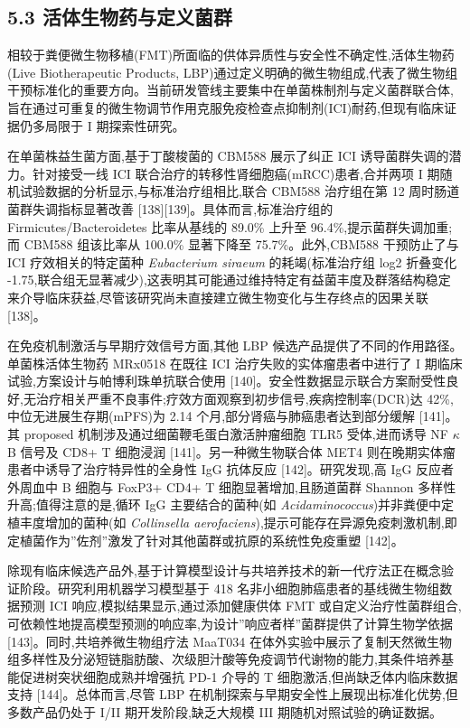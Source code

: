 \documentclass[11pt]{article}
\begin{document}
\subsection{5.3 活体生物药与定义菌群}\label{ux6d3bux4f53ux751fux7269ux836fux4e0eux5b9aux4e49ux83ccux7fa4}

相较于粪便微生物移植(FMT)所面临的供体异质性与安全性不确定性,活体生物药(Live Biotherapeutic Products, LBP)通过定义明确的微生物组成,代表了微生物组干预标准化的重要方向。当前研发管线主要集中在单菌株制剂与定义菌群联合体,旨在通过可重复的微生物调节作用克服免疫检查点抑制剂(ICI)耐药,但现有临床证据仍多局限于 I 期探索性研究。

在单菌株益生菌方面,基于丁酸梭菌的 CBM588 展示了纠正 ICI 诱导菌群失调的潜力。针对接受一线 ICI 联合治疗的转移性肾细胞癌(mRCC)患者,合并两项 I 期随机试验数据的分析显示,与标准治疗组相比,联合 CBM588 治疗组在第 12 周时肠道菌群失调指标显著改善 {[}138{]}{[}139{]}。具体而言,标准治疗组的 Firmicutes/Bacteroidetes 比率从基线的 89.0\% 上升至 96.4\%,提示菌群失调加重;而 CBM588 组该比率从 100.0\% 显著下降至 75.7\%。此外,CBM588 干预防止了与 ICI 疗效相关的特定菌种 \emph{Eubacterium siraeum} 的耗竭(标准治疗组 log2 折叠变化 -1.75,联合组无显著减少),这表明其可能通过维持特定有益菌丰度及群落结构稳定来介导临床获益,尽管该研究尚未直接建立微生物变化与生存终点的因果关联 {[}138{]}。

在免疫机制激活与早期疗效信号方面,其他 LBP 候选产品提供了不同的作用路径。单菌株活体生物药 MRx0518 在既往 ICI 治疗失败的实体瘤患者中进行了 I 期临床试验,方案设计与帕博利珠单抗联合使用 {[}140{]}。安全性数据显示联合方案耐受性良好,无治疗相关严重不良事件;疗效方面观察到初步信号,疾病控制率(DCR)达 42\%,中位无进展生存期(mPFS)为 2.14 个月,部分肾癌与肺癌患者达到部分缓解 {[}141{]}。其 proposed 机制涉及通过细菌鞭毛蛋白激活肿瘤细胞 TLR5 受体,进而诱导 NF \(\kappa\) B 信号及 CD8+ T 细胞浸润 {[}141{]}。另一种微生物联合体 MET4 则在晚期实体瘤患者中诱导了治疗特异性的全身性 IgG 抗体反应 {[}142{]}。研究发现,高 IgG 反应者外周血中 B 细胞与 FoxP3+ CD4+ T 细胞显著增加,且肠道菌群 Shannon 多样性升高;值得注意的是,循环 IgG 主要结合的菌种(如 \emph{Acidaminococcus})并非粪便中定植丰度增加的菌种(如 \emph{Collinsella aerofaciens}),提示可能存在异源免疫刺激机制,即定植菌作为''佐剂''激发了针对其他菌群或抗原的系统性免疫重塑 {[}142{]}。

除现有临床候选产品外,基于计算模型设计与共培养技术的新一代疗法正在概念验证阶段。研究利用机器学习模型基于 418 名非小细胞肺癌患者的基线微生物组数据预测 ICI 响应,模拟结果显示,通过添加健康供体 FMT 或自定义治疗性菌群组合,可依赖性地提高模型预测的响应率,为设计''响应者样''菌群提供了计算生物学依据 {[}143{]}。同时,共培养微生物组疗法 MaaT034 在体外实验中展示了复制天然微生物组多样性及分泌短链脂肪酸、次级胆汁酸等免疫调节代谢物的能力,其条件培养基能促进树突状细胞成熟并增强抗 PD-1 介导的 T 细胞激活,但尚缺乏体内临床数据支持 {[}144{]}。总体而言,尽管 LBP 在机制探索与早期安全性上展现出标准化优势,但多数产品仍处于 I/II 期开发阶段,缺乏大规模 III 期随机对照试验的确证数据。
\end{document}
